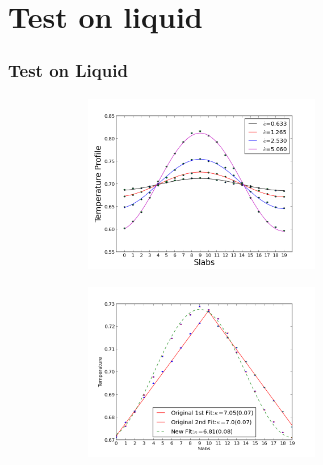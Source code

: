 \documentclass{beamer}
\begin{document}
\section{Test on liquid}
%
\begin{frame}
\frametitle{Test on Liquid}
\begin{figure}
  \begin{subfigure}[b]{.45\linewidth}
    \centering
    \includegraphics[height=4.5cm]{liquid.png}
  \end{subfigure}\hfill
  \begin{subfigure}[b]{.45\linewidth}
    \centering
    \includegraphics[height=4.5cm]{amplitude.png}
  \end{subfigure}\hfill
\end{figure}
\end{frame}
\end{document}

